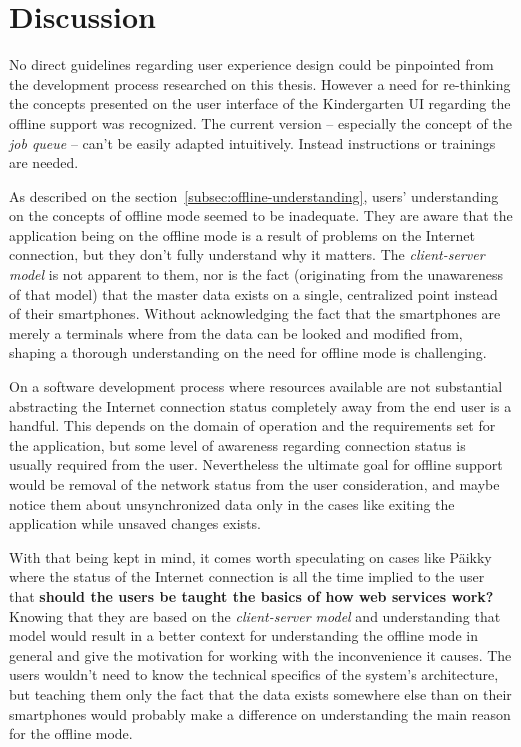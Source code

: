 \section{Discussion}



No direct guidelines regarding user experience design could be pinpointed from the development process researched on this thesis. However a need for re-thinking the concepts presented on the user interface of the Kindergarten UI regarding the offline support was recognized. The current version – especially the concept of the \textit{job queue} – can't be easily adapted intuitively. Instead instructions or trainings are needed.

As described on the section~\ref{subsec:offline-understanding}, users' understanding on the concepts of offline mode seemed to be inadequate. They are aware that the application being on the offline mode is a result of  problems on the Internet connection, but they don't fully understand why it matters. The \textit{client-server model} is not apparent to them, nor is the fact (originating from the unawareness of that model) that the master data exists on a single, centralized point instead of their smartphones. Without acknowledging the fact that the smartphones are merely a terminals where from the data can be looked and modified from, shaping a thorough understanding on the need for offline mode is challenging.

On a software development process where resources available are not substantial abstracting the Internet connection status completely away from the end user is a handful. This depends on the domain of operation and the requirements set for the application, but some level of awareness regarding connection status is usually required from the user. Nevertheless the ultimate goal for offline support would be removal of the network status from the user consideration, and maybe notice them about unsynchronized data only in the cases like exiting the application while unsaved changes exists.

With that being kept in mind, it comes worth speculating on cases like Päikky where the status of the Internet connection is all the time implied to the user that \textbf{should the users be taught the basics of how web services work?} Knowing that they are based on the \textit{client-server model} and understanding that model would result in a better context for understanding the offline mode in general and give the motivation for working with the inconvenience it causes. The users wouldn't need to know the technical specifics of the system's architecture, but teaching them only the fact that the data exists somewhere else than on their smartphones would probably make a difference on understanding the main reason for the offline mode.

